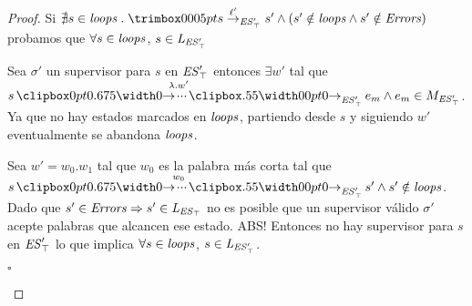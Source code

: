 \begin{proof}
Si $\nexists s \in \SCC \ldot \trimlst{s \step{\l'}{\unexploredToTop{\structure'}}  s'} \wedge (s' \notin \SCC \wedge s' \notin \Errors)$ probamos que $\forall s \in \mathit{loops}$, $s \in \mathit{L_{\mathit{\mathit{ES}'_{\top}}}}$

Sea $\sigma'$ un supervisor para $s$ en $\mathit{\mathit{ES}'_{\top}}$ entonces $\exists w'$ tal que  $s \runw{\lambda.w'}{\unexploredToTop{\structure'}} e_m \wedge e_m \in M_{\unexploredToTop{\structure'}}$. Ya que no hay estados marcados en $\mathit{loops}$, partiendo desde $s$ y siguiendo $w'$ eventualmente se abandona $\mathit{loops}$.

Sea $w' = w_0.w_1$ tal que $w_0$ es la palabra más corta tal que $s \runw{w_0}{\unexploredToTop{\structure'}} s' \wedge s' \notin \SCC$. Dado que $s'\in \mathit{Errors} \Rightarrow s' \in \mathit{L_{\mathit{\mathit{ES}_{\top}}}}$ no es posible que un supervisor válido $\sigma'$ acepte palabras que alcancen ese estado. ABS! Entonces no hay supervisor para $s$ en $\mathit{\mathit{ES}'_{\top}}$ lo que implica $\forall s \in \mathit{loops}$, $s \in \mathit{L_{\mathit{\mathit{ES}'_{\top}}}}$.
\begin{flushright}
	$\square$
\end{flushright}
\end{proof}